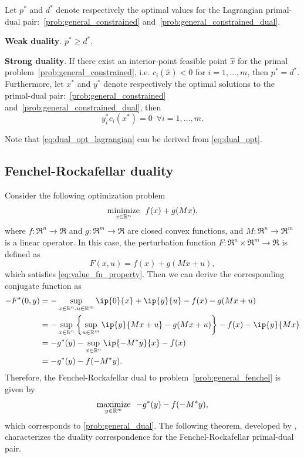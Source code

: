 \begin{theorem} 
    Let $p^*$ and $d^*$ denote respectively the optimal values for the Lagrangian primal-dual pair:~\eqref{prob:general_constrained} and~\eqref{prob:general_constrained_dual}. 
    \item \textbf{Weak duality}. $p^* \geq d^*$. 
    \item \textbf{Strong duality}. 
    If there exist an interior-point feasible point $\hat x$ for the primal problem~\eqref{prob:general_constrained}, i.e. $c_i(\hat x) < 0$ for $i = 1,\dots,m$, then $p^* = d^*$. Furthermore, let $x^*$ and $y^*$ denote respectively the optimal solutions to the primal-dual pair:~\eqref{prob:general_constrained} and~\eqref{prob:general_constrained_dual}, then 
    \begin{equation} \label{eq:dual_opt_lagrangian}
        y_i^*c_i(x^*) = 0 \enspace \forall i = 1,\dots,m.
    \end{equation}
\end{theorem}
Note that \eqref{eq:dual_opt_lagrangian} can be derived from \eqref{eq:dual_opt}.


\subsection{Fenchel-Rockafellar duality}
Consider the following optimization problem 
\begin{equation} \label{prob:general_fenchel} 
    \displaystyle\mathop{\hbox{\rm minimize}}_{x \in \mathbb{R}^n}\enspace f(x) + g(Mx),
\end{equation}
where $f:\Re^n\to\Re$ and $g:\Re^m\to\Re$ are closed convex functions, and $M:\Re^n\to\Re^m$ is a linear operator. In this case, the perturbation function $F: \Re^n \times \Re^m \to \Re$ is defined as 
\begin{equation}
    F(x, u) = f(x) + g(Mx + u),
\end{equation}
which satisfies \eqref{eq:value_fn_property}. 
Then we can derive the corresponding conjugate function as
\begin{align*}
    -F^*(0, y) &= -\sup_{x\in\Re^n, u\in\Re^m} \ip{0}{x} + \ip{y}{u} - f(x) - g(Mx + u)
             \\&= -\sup_{x\in\Re^n} \left\{\sup_{u\in\Re^m} \ip{y}{Mx + u} - g(Mx + u)\right\} - f(x) - \ip{y}{Mx}
             \\&= - g^*(y) - \sup_{x\in\Re^n}\ip{-M^*y}{x} - f(x) 
             \\&= - g^*(y) - f(-M^*y).
\end{align*}
Therefore, the Fenchel-Rockafellar dual to problem~\eqref{prob:general_fenchel} is given by
\begin{equation} \label{prob:general_fenchel_dual}
    \displaystyle\mathop{\hbox{\rm maximize}}_{y\in\mathbb{R}^m}\enspace - g^*(y) - f(-M^*y),
\end{equation}
which corresponds to \eqref{prob:general_dual}. 
The following theorem, developed by \citet{rockafellar1970convex}, characterizes the duality correspondence for the Fenchel-Rockafellar primal-dual pair. 

